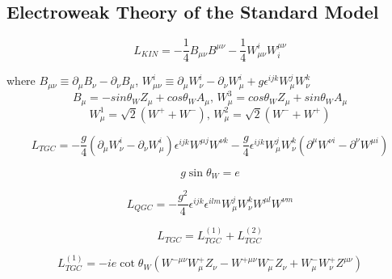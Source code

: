 \subsection{Electroweak Theory of the Standard Model}
\label{sec:WgAbout_SMEWK}



\begin{equation} \label{eq:L_gauge_kin}
L_{KIN}=-\frac{1}{4}B_{\mu\nu}B^{\mu\nu}-\frac{1}{4}W_{\mu\nu}^i W^{\mu\nu}_i
\end{equation}

where $B_{\mu\nu} \equiv \partial_\mu B_\nu - \partial_\nu B_\mu$, $W_{\mu\nu}^i \equiv \partial_\mu W_\nu^i - \partial_\nu W_\mu^i + g \epsilon^{ijk} W_\mu^j W_\nu^k$\\

\begin{equation} \label{eq:EWK_Zg_bosons_mixing}
B_\mu = -sin \theta_W Z_\mu + cos \theta_W A_\mu \text{, } W_\mu^3 = cos \theta_W Z_\mu + sin \theta_W A_\mu
\end{equation}
\begin{equation} \label{eq:EWK_Zg_bosons_mixing}
W_\mu^1 = \sqrt{2}(W^+ + W^-) \text{, }W_\mu^2 = \sqrt{2}(W^- + W^+)
\end{equation}

\begin{equation} \label{eq:L_TGC_1}
L_{TGC} = -\frac{g}{4}(\partial_\mu W_\nu^i - \partial_\nu W_\mu^i)\epsilon^{ijk}W^{\mu j}W^{\nu k} - \frac{g}{4}\epsilon^{ijk}W_\mu^j W_\nu^k (\partial^\mu W^{\nu i} - \partial^\nu W^{\mu i})
\end{equation}

\begin{equation} \label{eq:g_vs_e}
g \sin \theta_W = e
\end{equation}

\begin{equation} \label{eq:L_QGC_1}
L_{QGC} = -\frac{g^2}{4} \epsilon^{ijk} \epsilon^{ilm} W_\mu^j W_\nu^k W^{\mu l} W^{\nu m}
\end{equation}

\begin{equation} \label{eq:L_TGC_2}
L_{TGC} = L_{TGC}^{(1)} + L_{TGC}^{(2)}
\end{equation}

\begin{equation} \label{eq:L_TGC_2_1}
L_{TGC}^{(1)} = -ie \cot \theta_W (W^{-\mu\nu} W^{+}_\mu Z_\nu - W^{+\mu\nu} W^-_\mu Z_\nu +W^-_\mu W^+_\nu Z^{\mu\nu}) 
\end{equation}

